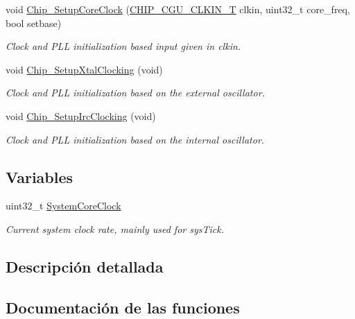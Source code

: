 \begin{DoxyCompactItemize}
void \hyperlink{group___s_u_p_p_o_r_t__18_x_x__43_x_x___f_u_n_c_ga54251628aeac543524d98d4db12c39f9}{Chip\+\_\+\+Setup\+Core\+Clock} (\hyperlink{group___c_l_o_c_k__18_x_x__43_x_x_ga0975326707efebf2b074283e6c602f18}{C\+H\+I\+P\+\_\+\+C\+G\+U\+\_\+\+C\+L\+K\+I\+N\+\_\+T} clkin, uint32\+\_\+t core\+\_\+freq, bool setbase)
\begin{DoxyCompactList}\small\item\em Clock and P\+LL initialization based input given in {\itshape clkin}. \end{DoxyCompactList}\item 
void \hyperlink{group___s_u_p_p_o_r_t__18_x_x__43_x_x___f_u_n_c_ga18737e4a022570724c77c5cdea9c0258}{Chip\+\_\+\+Setup\+Xtal\+Clocking} (void)
\begin{DoxyCompactList}\small\item\em Clock and P\+LL initialization based on the external oscillator. \end{DoxyCompactList}\item 
void \hyperlink{group___s_u_p_p_o_r_t__18_x_x__43_x_x___f_u_n_c_ga6eff97a8da15798119eada6c5f000404}{Chip\+\_\+\+Setup\+Irc\+Clocking} (void)
\begin{DoxyCompactList}\small\item\em Clock and P\+LL initialization based on the internal oscillator. \end{DoxyCompactList}\end{DoxyCompactItemize}
\subsection*{Variables}
\begin{DoxyCompactItemize}
\item 
uint32\+\_\+t \hyperlink{group___s_u_p_p_o_r_t__18_x_x__43_x_x___f_u_n_c_gaa3cd3e43291e81e795d642b79b6088e6}{System\+Core\+Clock}
\begin{DoxyCompactList}\small\item\em Current system clock rate, mainly used for sys\+Tick. \end{DoxyCompactList}\end{DoxyCompactItemize}


\subsection{Descripción detallada}


\subsection{Documentación de las funciones}
